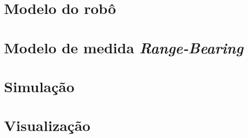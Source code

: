 \section{Modelo do robô}

\section{Modelo de medida \textit{Range-Bearing}}

\section{Simulação}

\section{Visualização}
